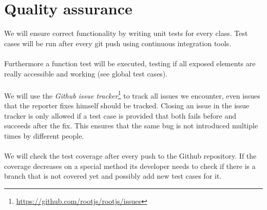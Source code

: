 \chapter{Quality assurance}
We will ensure correct functionality by writing unit tests for every class. Test cases will be run after every git push using continuous integration tools.\\ \\
Furthermore a function test will be executed, testing if all exposed elements are really accessible and working (see global test cases).\\ \\
We will use the \textit{Github issue tracker}\footnote{\url{https://github.com/rootjs/rootjs/issues}} to track all issues we encounter, even issues that the reporter fixes himself should be tracked.
Closing an issue in the issue tracker is only allowed if a test case is provided that both fails before and succeeds after the fix. This ensures that the same bug is not introduced multiple times by different people.\\ \\
We will check the test coverage after every push to the Github repository. If the coverage decreases on a special method its developer needs to check if there is a branch that is not covered yet and possibly add new test cases for it.
